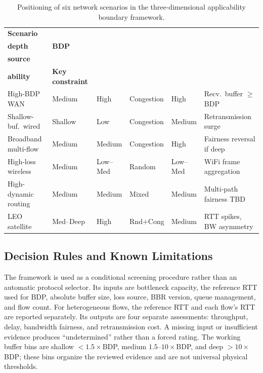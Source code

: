 \documentclass[a4paper,fleqn]{cas-sc}
\begin{document}
\begin{table}[pos=tbp]
  \caption{Positioning of six network scenarios in the three-dimensional
    applicability boundary framework.}
  \label{tab:framework}
  \small
  \begin{tabularx}{\tblwidth}{@{}p{2.1cm}p{1.3cm}p{1.2cm}p{1.5cm}p{1.6cm}X@{}}
    \toprule
    \textbf{Scenario} & \makecell[l]{\textbf{Buffer}\\\textbf{depth}} & \textbf{BDP}
      & \makecell[l]{\textbf{Loss}\\\textbf{source}} & \makecell[l]{\textbf{Suit-}\\\textbf{ability}}
      & \textbf{Key constraint} \\
    \midrule
    High-BDP WAN & Medium & High & Congestion & High & Recv.\ buffer $\geq$ BDP \\
    Shallow-buf.\ wired & Shallow & Low & Congestion & Medium & Retransmission surge \\
    Broadband multi-flow & Medium & Medium & Congestion & High & Fairness reversal if deep \\
    High-loss wireless & Medium & Low--Med & Random & Low--Med & WiFi frame aggregation \\
    High-dynamic routing & Medium & Medium & Mixed & Medium & Multi-path fairness TBD \\
    LEO satellite & Med--Deep & High & Rnd+Cong & Medium & RTT spikes, BW asymmetry \\
    \bottomrule
  \end{tabularx}
\end{table}

\subsection{Decision Rules and Known Limitations}
\label{sec:framework_rules}

The framework is used as a conditional screening procedure rather than an
automatic protocol selector. Its inputs are bottleneck capacity, the reference
RTT used for BDP, absolute buffer size, loss source, BBR version, queue
management, and flow count. For heterogeneous flows, the reference RTT and each
flow's RTT are reported separately. Its outputs are four separate assessments:
throughput, delay, bandwidth fairness, and retransmission cost. A missing input
or insufficient evidence produces ``undetermined'' rather than a forced rating.
The working buffer bins are shallow $<1.5\times$BDP, medium
$1.5$--$10\times$BDP, and deep $>10\times$BDP; these bins organize the reviewed
evidence and are not universal physical thresholds.
\end{document}
